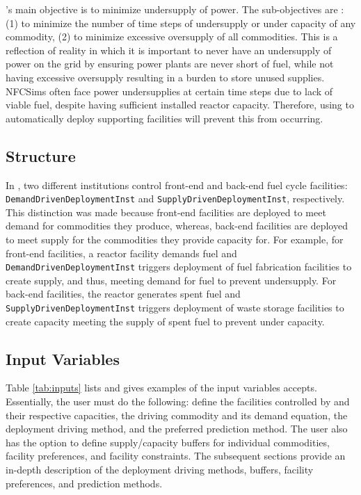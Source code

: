 \deploy's main objective is to minimize
undersupply of power. 
The sub-objectives are : (1) to minimize the number of time 
steps of undersupply or under capacity of any 
commodity, (2) to minimize excessive oversupply of all commodities.
This is a reflection of reality in which it is important to 
never have an undersupply of power on the grid by ensuring power 
plants are never short of fuel, while not 
having excessive oversupply resulting in a burden to store unused 
supplies. 
\glspl{NFCSim} often face power undersupplies at certain time steps 
due to lack of viable fuel, despite having sufficient installed 
reactor capacity.  
Therefore, using \deploy to automatically deploy supporting facilities 
will prevent this from occurring. 

\subsection{Structure}
In \deploy, two different institutions control 
front-end and back-end fuel cycle facilities: 
\texttt{DemandDrivenDeploymentInst} and 
\texttt{SupplyDrivenDeploymentInst}, respectively. 
This distinction was made because front-end facilities 
are deployed to meet demand for commodities they produce, 
whereas, back-end facilities are deployed to meet supply for the 
commodities they provide capacity for. 
For example, for front-end facilities, a reactor facility 
demands fuel and \texttt{DemandDrivenDeploymentInst} 
triggers deployment of fuel fabrication facilities to create 
supply, and thus, meeting demand for fuel to prevent undersupply. 
For back-end facilities, the reactor generates spent fuel and 
\texttt{SupplyDrivenDeploymentInst} triggers deployment of 
waste storage facilities to create capacity meeting the supply 
of spent fuel to prevent under capacity. 

\subsection{Input Variables}
Table \ref{tab:inputs} lists and gives examples of the input 
variables \deploy accepts. 
Essentially, the user must do the following: 
define the facilities controlled by \deploy and their respective 
capacities, the driving commodity and 
its demand equation, the deployment driving method, and the 
preferred prediction method. 
The user also has the option to define supply/capacity buffers 
for individual commodities, facility preferences, and facility 
constraints. 
The subsequent sections provide an 
in-depth description of the deployment driving methods, buffers, 
facility preferences, and prediction methods. 


